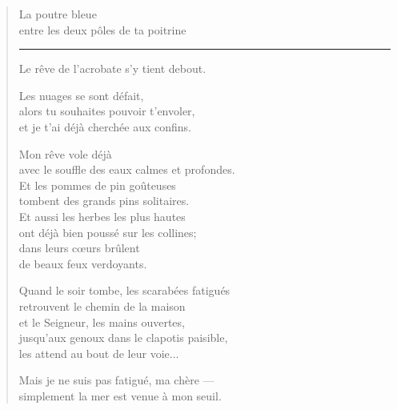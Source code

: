 \documentclass[11pt]{extbook}
\newcommand*{\centeredornament}{\centerline{\pgfornament[width=6cm]{88}}}
\begin{document}
\begin{verse}
  La poutre bleue \\
  entre les deux pôles de ta poitrine \\
  \rule[0.2em]{3em}{0.5pt} Le rêve de l'acrobate s'y tient debout.\hspace*{-1mm}

  Les nuages se sont défait, \\
  alors tu souhaites pouvoir t'envoler, \\
  et je t'ai déjà cherchée aux confins.

  Mon rêve vole déjà \\
  avec le souffle des eaux calmes et profondes. \\
  Et les pommes de pin goûteuses \\
  tombent des grands pins solitaires. \\
  Et aussi les herbes les plus hautes \\
  ont déjà bien poussé sur les collines; \\
  dans leurs cœurs brûlent \\
  de beaux feux verdoyants.

  Quand le soir tombe, les scarabées fatigués \\
  retrouvent le chemin de la maison \\
  et le Seigneur, les mains ouvertes, \\
  jusqu'aux genoux dans le clapotis paisible, \\
  les attend au bout de leur voie...

  Mais je ne suis pas fatigué, ma chère --- \\
  simplement la mer est venue à mon seuil.
\end{verse}

\newpage

\vspace*{-15mm}
\centeredornament


\end{document}

